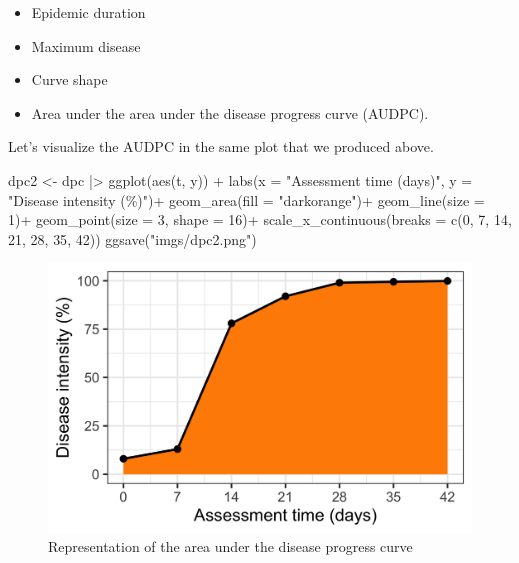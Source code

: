 \documentclass[
  letterpaper,
  DIV=11,
  numbers=noendperiod]{scrreprt}
\newenvironment{Shaded}{\begin{snugshade}}{\end{snugshade}}
\newcommand{\AttributeTok}[1]{\textcolor[rgb]{0.40,0.45,0.13}{#1}}
\newcommand{\DecValTok}[1]{\textcolor[rgb]{0.68,0.00,0.00}{#1}}
\newcommand{\FunctionTok}[1]{\textcolor[rgb]{0.28,0.35,0.67}{#1}}
\newcommand{\NormalTok}[1]{\textcolor[rgb]{0.00,0.23,0.31}{#1}}
\newcommand{\OtherTok}[1]{\textcolor[rgb]{0.00,0.23,0.31}{#1}}
\newcommand{\SpecialCharTok}[1]{\textcolor[rgb]{0.37,0.37,0.37}{#1}}
\newcommand{\StringTok}[1]{\textcolor[rgb]{0.13,0.47,0.30}{#1}}
\providecommand{\tightlist}{%
  \setlength{\itemsep}{0pt}\setlength{\parskip}{0pt}}\usepackage{longtable,booktabs,array}
\begin{document}
\begin{itemize}
\tightlist
\item
  Epidemic duration
\item
  Maximum disease
\item
  Curve shape
\item
  Area under the area under the disease progress curve (AUDPC).
\end{itemize}

Let's visualize the AUDPC in the same plot that we produced above.

\begin{Shaded}
\begin{Highlighting}[]
\NormalTok{dpc2 }\OtherTok{\textless{}{-}}\NormalTok{ dpc }\SpecialCharTok{|\textgreater{}}
  \FunctionTok{ggplot}\NormalTok{(}\FunctionTok{aes}\NormalTok{(t, y)) }\SpecialCharTok{+}
  \FunctionTok{labs}\NormalTok{(}\AttributeTok{x =} \StringTok{"Assessment time (days)"}\NormalTok{,}
       \AttributeTok{y =} \StringTok{"Disease intensity (\%)"}\NormalTok{)}\SpecialCharTok{+}
    \FunctionTok{geom\_area}\NormalTok{(}\AttributeTok{fill =} \StringTok{"darkorange"}\NormalTok{)}\SpecialCharTok{+}
    \FunctionTok{geom\_line}\NormalTok{(}\AttributeTok{size =} \DecValTok{1}\NormalTok{)}\SpecialCharTok{+}
  \FunctionTok{geom\_point}\NormalTok{(}\AttributeTok{size =} \DecValTok{3}\NormalTok{, }\AttributeTok{shape =} \DecValTok{16}\NormalTok{)}\SpecialCharTok{+}
  \FunctionTok{scale\_x\_continuous}\NormalTok{(}\AttributeTok{breaks =} \FunctionTok{c}\NormalTok{(}\DecValTok{0}\NormalTok{, }\DecValTok{7}\NormalTok{, }\DecValTok{14}\NormalTok{, }\DecValTok{21}\NormalTok{, }\DecValTok{28}\NormalTok{, }\DecValTok{35}\NormalTok{, }\DecValTok{42}\NormalTok{))}
\FunctionTok{ggsave}\NormalTok{(}\StringTok{"imgs/dpc2.png"}\NormalTok{)}
\end{Highlighting}
\end{Shaded}

\begin{figure}

{\centering \includegraphics{imgs/dpc2.png}

}

\caption{\label{fig-audpc2}Representation of the area under the disease
progress curve}

\end{figure}
\end{document}
